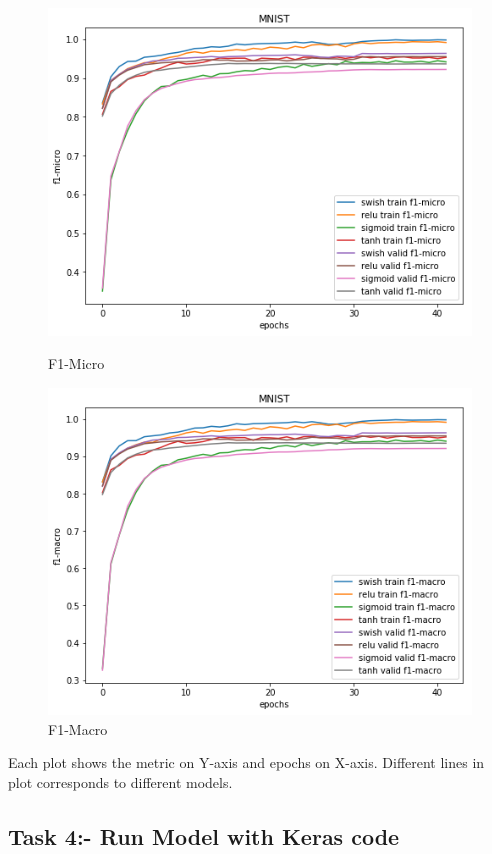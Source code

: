 \documentclass{article}
\begin{document}
\begin{figure}[!htb]
	\includegraphics[width=\linewidth]{../output_plots/part_1_task_3_f1-micro.png}
	\caption{F1-Micro}\label{fig:part_1_task_3_f1-micro}
	\endminipage
	\includegraphics[width=\linewidth]{../output_plots/part_1_task_3_f1-macro.png}
	\caption{F1-Macro}\label{fig:part_1_task_3_f1-macro}
	\endminipage
\end{figure}

Each plot shows the metric on Y-axis and epochs on X-axis. Different lines in plot corresponds to different models.

\pagebreak

\subsection{Task 4:- Run Model with Keras code}
\end{document}

